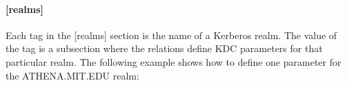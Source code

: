 \documentclass[letterpaper,10pt,english]{sphinxmanual}
\begin{document}
\paragraph{{[}realms{]}}
\label{\detokenize{admin/conf_files/kdc_conf:realms}}\label{\detokenize{admin/conf_files/kdc_conf:kdc-realms}}
Each tag in the {[}realms{]} section is the name of a Kerberos realm.  The
value of the tag is a subsection where the relations define KDC
parameters for that particular realm.  The following example shows how
to define one parameter for the ATHENA.MIT.EDU realm:

%
\begin{sphinxVerbatim}[commandchars=\\\{\}]
\PYG{p}{[}\PYG{p}{]}
      
             
\end{sphinxVerbatim}
\end{document}
